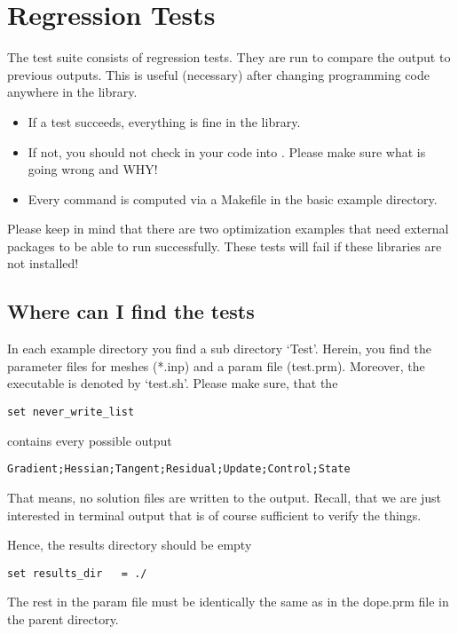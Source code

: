 \chapter{Regression Tests}\label{chap:test}
The \dope{} test suite consists of regression tests. They are run to compare 
the output to previous outputs. This is useful (necessary) after 
changing programming code anywhere in the library. 

\begin{itemize}
\item If a test
succeeds, everything is fine in the library. 
\item If not, you should not
check in your code into \dope{}. 
Please make sure what is going wrong and WHY!
\item 
Every command is computed via a Makefile in the basic example 
directory.
\end{itemize}

\begin{remark}
Please keep in mind that there are two optimization examples that 
need external packages to be able to run successfully. These tests will
fail if these libraries are not installed!
\end{remark}

\section{Where can I find the tests}
In each example directory you find a sub directory `Test'. Herein, you find 
the parameter files for meshes (*.inp) and a param file (test.prm).
Moreover, the executable is denoted by `test.sh'. Please make sure, that 
the 
\begin{verbatim}
set never_write_list
\end{verbatim}
contains every possible output
\begin{verbatim}
Gradient;Hessian;Tangent;Residual;Update;Control;State
\end{verbatim}
That means, no solution files are written to the output.
Recall, that we are just interested in terminal output that 
is of course sufficient to verify the things.

Hence, the results directory should be empty
\begin{verbatim}
set results_dir   = ./
\end{verbatim}
The rest in the param file must be identically the same as 
in the dope.prm file in the parent directory. 

